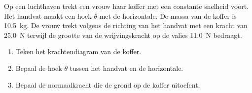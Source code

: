 \documentclass{ximera}
\begin{document}
\begin{exercise}
	Op een luchthaven trekt een vrouw haar koffer met een constante snelheid voort. Het handvat maakt een hoek $\theta$ met de horizontale. De massa van de koffer is \SI{10,5}{kg}. De vrouw trekt volgens de richting van het handvat met een kracht van \SI{25,0}{N} terwijl de grootte van de wrijvingskracht op de valies \SI{11,0}{N} bedraagt.

	\begin{minipage}[t]{.7\linewidth}
		\begin{enumerate}
			\item Teken het krachtendiagram van de koffer.%
			\item Bepaal de hoek $\theta$ tussen het handvat en de horizontale.
			\item Bepaal de normaalkracht die de grond op de koffer uitoefent.
		\end{enumerate}
	\end{minipage}
	\hfill
	\begin{minipage}[t]{.3\linewidth}
	\end{minipage}
	

\end{exercise}
\end{document}
